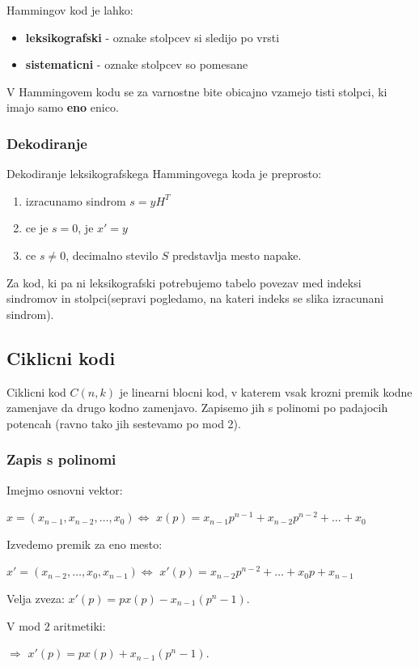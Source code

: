 \documentclass{article}
\begin{document}
\begin{multicols}{3}
Hammingov kod je lahko:
\begin{itemize}
    \item \textbf{leksikografski} - oznake stolpcev si sledijo po vrsti
    \item \textbf{sistematicni} - oznake stolpcev so pomesane
\end{itemize}

 V Hammingovem kodu se za varnostne bite obicajno vzamejo tisti stolpci, ki imajo samo \textbf{eno} enico.

\subsubsection{Dekodiranje}
Dekodiranje leksikografskega Hammingovega koda je preprosto:
\begin{enumerate}
    \item izracunamo sindrom $s = yH^T$
    \item ce je $s = 0$, je $x' = y$
    \item ce $s \neq 0$, decimalno stevilo $S$ predstavlja mesto napake.
\end{enumerate}
Za kod, ki pa ni leksikografski potrebujemo tabelo povezav med indeksi sindromov in stolpci(sepravi pogledamo, na kateri indeks se slika izracunani sindrom).

\subsection{Ciklicni kodi}
Ciklicni kod $C(n, k)$ je linearni blocni kod, v katerem vsak krozni premik kodne zamenjave
da drugo kodno zamenjavo. Zapisemo jih s polinomi po padajocih potencah (ravno tako jih sestevamo po mod 2). 

\subsubsection{Zapis s polinomi}
Imejmo osnovni vektor: 
\begin{center}
    $x = (x_{n-1}, x_{n-2}, \dots, x_0) \Leftrightarrow$
    $x(p) = x_{n-1}p^{n-1} + x_{n-2}p^{n-2} + \dots + x_0$ 
\end{center}
Izvedemo premik za eno mesto:
\begin{center}
    $x' = (x_{n-2}, \dots, x_0, x_{n-1}) \Leftrightarrow$
    $x'(p) = x_{n-2}p^{n-2} + \dots + x_0p + x_{n-1}$ 
\end{center}
Velja zveza: $x'(p) = px(p) - x_{n-1}(p^n -1)$.

V mod $2$ aritmetiki:
\begin{center}
    $\Rightarrow$ $x'(p) = px(p) + x_{n-1}(p^n -1)$.
\end{center}


\end{multicols}
\end{document}
